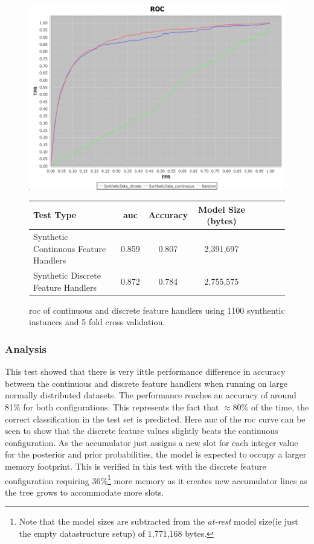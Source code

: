 \documentclass[a4paper,11pt]{scrreprt}
\begin{document}
\begin{figure}[h!]
\centering
\caption{\acrshort{roc} of continuous and discrete feature handlers using 1100 synthentic instances and 5 fold cross validation.}
\includegraphics[scale=0.45, trim=0 -25 0 0, clip=true] {1000-instance-training-100-testing-synthetictest2.png}
\label{fig:syntheticresults2}
\begin{tabular}{l*{6}{c}r}
Test Type & \acrshort{auc} & Accuracy & Model Size (bytes)\\
\hline
Synthetic Continuous Feature Handlers & 0.859 & 0.807 & 2,391,697\\
Synthetic Discrete Feature Handlers & 0.872 & 0.784 & 2,755,575\\

\end{tabular}
\end{figure}

\subsubsection{Analysis}
This test showed that there is very little performance difference in accuracy between the continuous and discrete feature handlers when running on large normally distributed datasets. The performance reaches an accuracy of around 81\% for both configurations. This represents the fact that \(\approx80\%\) of the time, the correct classification in the test set is predicted. Here \acrshort{auc} of the \acrshort{roc} curve can be seen to show that the discrete feature values slightly beats the continuous configuration. As the accumulator just assigns a new slot for each integer value for the posterior and prior probabilities, the model is expected to occupy a larger memory footprint. This is verified in this test with the discrete feature configuration requiring 36\%\footnote{Note that the model sizes are subtracted from the \textit{at-rest} model size(ie just the empty datastructure setup) of 1,771,168 bytes.} more memory as it creates new accumulator lines as the tree grows to accommodate more slots.\\
\end{document}
